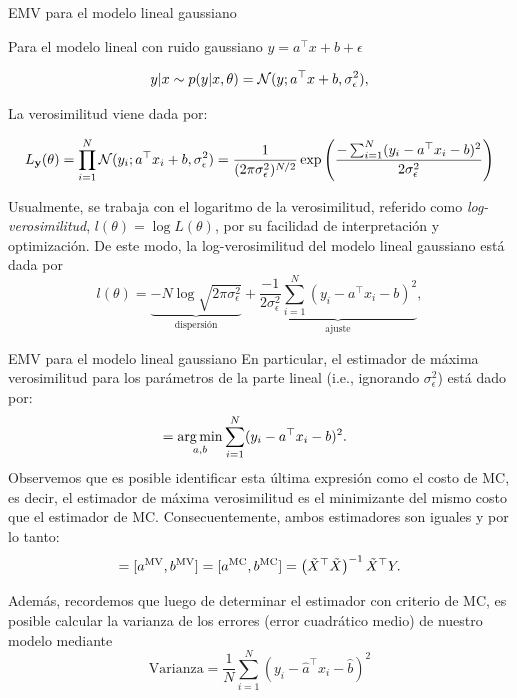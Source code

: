 \documentclass[9pt]{beamer}
\begin{document}
\begin{frame}{EMV para el modelo lineal gaussiano}

Para el modelo lineal con ruido gaussiano $y=a^\top x + b + \epsilon$

\begin{equation*}
	y|x \sim p(y|x,\theta) = {\mathcal N}(y;a^\top x + b ,\sigma_\epsilon^2),\label{eq:mod_lin_gau}
\end{equation*}

La verosimilitud viene dada por:

\begin{equation*}
	L_{\mathbf{y}}(\theta) =  \prod_{i=1}^N {\mathcal N}(y_i;a^\top x_i + b,\sigma_\epsilon^2) = \frac{1}{(2\pi\sigma_\epsilon^2)^{N/2}}  \exp\left(\frac{-\sum_{i=1}^N(y_i-a^\top x_i - b)^2}{2\sigma_\epsilon^2}\right) \label{eq:verosimilitud_lineal}
\end{equation*}\pause

Usualmente, se trabaja con el logaritmo de la verosimilitud, referido como \emph{log-verosimilitud}, $l(\theta) = \log L(\theta)$, por su facilidad de interpretación y optimización. De este modo, la log-verosimilitud del modelo lineal gaussiano está dada por
\begin{equation*}
	l(\theta) 
		= \underbrace{-N\log \sqrt{2\pi\sigma^2_\epsilon}}_{\text{dispersión}} + \underbrace{\frac{-1}{2\sigma_\epsilon^2} \sum_{i=1}^N (y_i-a^\top x_i - b)^2}_{\text{ajuste}},
\end{equation*}
	
\end{frame}

\begin{frame}{EMV para el modelo lineal gaussiano}
	En particular, el estimador  de máxima verosimilitud para los parámetros de  la parte lineal (i.e., ignorando $\sigma^2_\epsilon$) está dado por:
\begin{align*}
	 [a^{\text{MV}} ,b^{\text{MV}} ]
						&= \argmin_{a,b} \sum_{i=1}^N (y_i-a^\top x_i - b)^2. \label{eq:theta_ML}
\end{align*}\pause
Observemos que es posible identificar esta última expresión como el costo de MC, es decir, el estimador de máxima verosimilitud es el minimizante del mismo costo que el estimador de MC. Consecuentemente, ambos estimadores son iguales y por lo tanto:
\begin{equation*}
	 [\hat{a},\hat{b}] = [a^{\text{MV}} ,b^{\text{MV}} ]=[a^{\text{MC}} ,b^{\text{MC}} ] = \left(\tX^\top\tX\right)^{-1} \tX^\top Y.
\end{equation*}\pause

Además, recordemos que luego de determinar el estimador con criterio de MC, es posible calcular la varianza de los errores (error cuadrático medio) de nuestro modelo mediante 
\begin{equation*}
	\text{Varianza} = \frac{1}{N}\sum_{i=1}^N (y_i-\hat{a}^\top x_i -\hat{b})^2
\end{equation*}

\end{frame}
\end{document}
